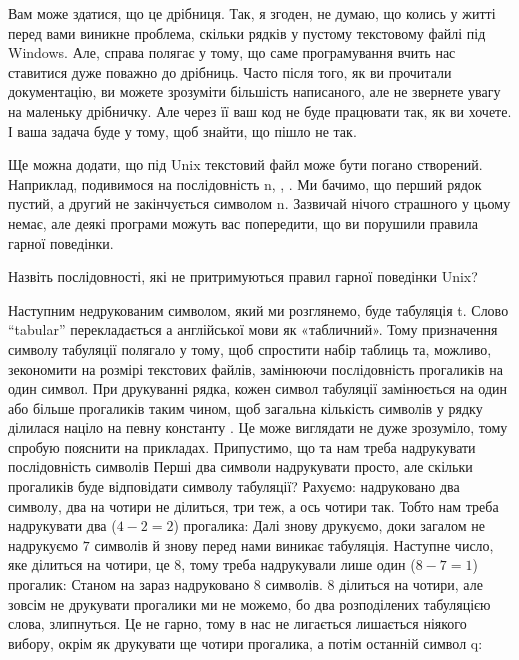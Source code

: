 Вам може здатися, що це дрібниця.
Так, я згоден, не думаю, що колись у житті перед вами виникне проблема, скільки рядків у пустому текстовому файлі під Windows.
Але, справа полягає у тому, що саме програмування вчить нас ставитися дуже поважно до дрібниць.
Часто після того, як ви прочитали документацію, ви можете зрозуміти більшість написаного, але не звернете увагу на маленьку дрібничку.
Але через її ваш код не буде працювати так, як ви хочете.
І ваша задача буде у тому, щоб знайти, що пішло не так.

Ще можна додати, що під Unix текстовий файл може бути погано створений.
Наприклад, подивимося на послідовність \chesc n, , .
Ми бачимо, що перший рядок пустий, а другий не закінчується символом \chesc n.
Зазвичай нічого страшного у цьому немає, але деякі програми можуть вас попередити, що ви порушили правила гарної поведінки.

\begin{exercise}
Назвіть послідовності, які не притримуються правил гарної поведінки Unix?

\end{exercise}

Наступним недрукованим символом, який ми розглянемо, буде табуляція \chesc t.
Слово “tabular” перекладається а англійської мови як «табличний».
Тому призначення символу табуляції полягало у тому, щоб спростити набір таблиць та, можливо, зекономити на розмірі текстових файлів, замінюючи послідовність прогаликів на один символ.
При друкуванні рядка, кожен символ табуляції замінюється на один або більше прогаликів таким чином, щоб загальна кількість символів у рядку ділилася націло на певну константу .
Це може виглядати не дуже зрозуміло, тому спробую пояснити на прикладах.
Припустимо, що  та нам треба надрукувати послідовність символів
Перші два символи надрукувати просто, але скільки прогаликів буде відповідати символу табуляції?
Рахуємо: надруковано два символу, два на чотири не ділиться, три теж, а ось чотири так.
Тобто нам треба надрукувати два ($4-2=2$) прогалика:
\textseq{\id{12\s\s}}
Далі знову друкуємо, доки загалом не надрукуємо $7$ символів й знову перед нами виникає табуляція.
Наступне число, яке ділиться на чотири, це $8$, тому треба надрукували лише один ($8-7=1$) прогалик:
\textseq{\id{12\s\s{}123\s}}
\noindent Станом на зараз надруковано $8$ символів.
$8$ ділиться на чотири, але зовсім не друкувати прогалики ми не можемо, бо два розподілених табуляцією слова, злипнуться.
Це не гарно, тому в нас не лигається лишається ніякого вибору, окрім як друкувати ще чотири прогалика, а потім останній символ \chr q:

